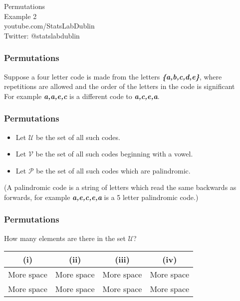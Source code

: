 \documentclass{beamer}
\begin{document}
\begin{frame}
\begin{center}
{ \Huge
Permutations} \\{\Large Example 2}
\\
\bigskip
{ \Large
youtube.com/StatsLabDublin \\ \vspace{0.2cm} Twitter: @statslabdublin
}
\end{center}
\end{frame}


\begin{frame}
\frametitle{Permutations}
\Large
\vspace{-1.0cm}
Suppose a four letter code is made from the letters \textbf{\textit{\{a,b,c,d,e\}}}, where repetitions are allowed and the order of the letters in the code is significant\\ \bigskip For example
\textbf{\textit{a,a,e,c}} is a different code to \textbf{\textit{a,c,e,a}}.
\end{frame}


\begin{frame}

\frametitle{Permutations}
\Large
\begin{itemize}
\item Let $\mathcal{U}$ be the set of all such codes.
\item Let $\mathcal{V}$ be the set of all such codes beginning with a vowel.
\item Let $\mathcal{P}$ be the set of all such codes which are palindromic.
\end{itemize} 
\bigskip
(A palindromic code is a string of letters which read the same backwards as forwards, for example \textbf{\textit{a,e,c,e,a}} is a 5 letter palindromic code.)\\ \bigskip

\end{frame}

\begin{frame}

\frametitle{Permutations}
\Large
How many elements are there in the set $\mathcal{U}$?
\begin{center}
\begin{tabular}{|c|c|c|c|}
\hline (i) &  (ii) &  (iii) &  (iv) \\ 
\hline {\color{white}More space} &{\color{white}More space}  & {\color{white}More space} &{\color{white}More space}  \\ 
 {\color{white}More space} &{\color{white}More space}  & {\color{white}More space} &{\color{white}More space}  \\ 
\hline 
\end{tabular} 
\end{center}
\end{frame}
\end{document}
